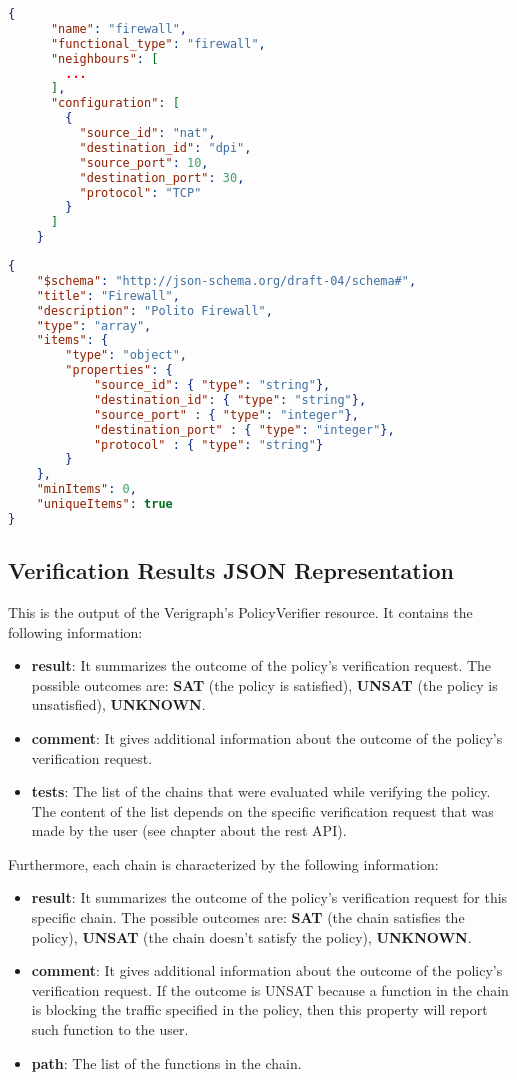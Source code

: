 \begin{lstlisting}[language=JSON, caption=Firewall example]
{
      "name": "firewall",
      "functional_type": "firewall",
      "neighbours": [
        ...
      ],
      "configuration": [
        {
          "source_id": "nat",
          "destination_id": "dpi",
          "source_port": 10,
          "destination_port": 30,
          "protocol": "TCP"
        }
      ]
    }
\end{lstlisting}

\begin{lstlisting}[language=JSON, caption=Firewall schema]
{
    "$schema": "http://json-schema.org/draft-04/schema#",
    "title": "Firewall",
    "description": "Polito Firewall",
    "type": "array",
    "items": {
        "type": "object",
        "properties": {
            "source_id": { "type": "string"},
            "destination_id": { "type": "string"},
			"source_port" : { "type": "integer"},
			"destination_port" : { "type": "integer"},
			"protocol" : { "type": "string"}
		}
    },
    "minItems": 0,
    "uniqueItems": true
}
\end{lstlisting}

\subsection{Verification Results JSON Representation}

This is the output of the Verigraph's PolicyVerifier resource. It contains the following information:
\begin{itemize}
 \item \textbf{result}: It summarizes the outcome of the policy's verification request. The possible outcomes are: \textbf{SAT} (the policy is satisfied), \textbf{UNSAT} (the policy is unsatisfied), \textbf{UNKNOWN}.
 \item \textbf{comment}: It gives additional information about the outcome of the policy's verification request.
 \item \textbf{tests}: The list of the chains that were evaluated while verifying the policy. The content of the list depends on the specific verification request that was made by the user (see chapter about the rest API).
\end{itemize}

Furthermore, each chain is characterized by the following information:
\begin{itemize}
 \item \textbf{result}: It summarizes the outcome of the policy's verification request for this specific chain. The possible outcomes are: \textbf{SAT} (the chain satisfies the policy), \textbf{UNSAT} (the chain doesn't satisfy the policy), \textbf{UNKNOWN}.
 \item \textbf{comment}: It gives additional information about the outcome of the policy's verification request. If the outcome is UNSAT because a function in the chain is blocking the traffic specified in the policy, then this property will report such function to the user. 
 \item \textbf{path}: The list of the functions in the chain.
\end{itemize}

